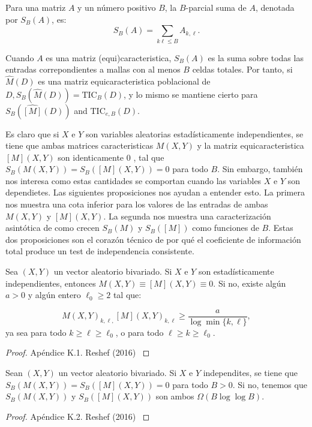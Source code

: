         \begin{defn}
            Para una matriz $A$	y un n\'umero positivo $B$, la $B$-parcial suma de 	$A$, denotada por  $S_B(A)$, es:
            $$
            S_B(A)=\sum_{k \ell \leq B} A_{k, \ell}.
            $$
            
            Cuando $A$ es una matriz (equi)caracteristica, $S_B(A)$ es la suma sobre todas las entradas correpondientes a mallas con al menos $B$ celdas totales. Por tanto, si $\widehat{M}(D)$ es una matriz equicaracteristica poblacional de $D, S_B(\widehat{M}(D))=\mathrm{TIC}_B(D)$, y lo mismo se mantiene cierto para $S_B(\widehat{[M]}(D))$ and $\mathrm{TIC}_{e, B}(D)$.
            
            Es claro que si $X$ e $Y$ son variables aleatorias estad\'isticamente independientes, se tiene que ambas matrices caracteristicas $M(X, Y)$ y la matriz equicaracteristica $[M](X, Y)$ son identicamente 0 , tal que $S_B(M(X, Y))=S_B([M](X, Y))=0$ para todo $B$. Sin embargo, tambi\'en nos interesa como estas cantidades se comportan cuando las variables $X$ e $Y$ son dependietes. Las siguientes proposiciones nos ayudan a entender esto. La primera nos muestra una cota inferior para los valores de las entradas de ambas $M(X, Y)$ y $[M](X, Y)$. La segunda nos muestra una caracterizaci\'on asint\'otica de como crecen $S_B(M)$ y $S_B([M])$ como funciones de $B$. Estas dos proposiciones son el coraz\'on t\'ecnico de por qu\'e el coeficiente de informaci\'on total produce un test de independencia consistente.
            
            \begin{prop}
                Sea $(X, Y)$ un vector aleatorio bivariado. Si $X$ e $Y$ son estad\'isticamente independientes, entonces $M(X, Y) \equiv[M](X, Y) \equiv 0$. Si no, existe alg\'un $a>0$ y alg\'un entero $\ell_0 \geq 2$ tal que:
                
                $$
                M(X, Y)_{k, \ell,}[M](X, Y)_{k, \ell} \geq \frac{a}{\log \min \{k, \ell\}},
                $$
                ya sea para todo $k \geq \ell \geq \ell_0$, o para todo $\ell \geq k \geq \ell_0$.
            \end{prop}
            \begin{proof}
                Ap\'endice K.1. Reshef (2016) \cite{Reshef2016}
            \end{proof}
            \begin{prop}
                Sean $(X, Y)$ un vector aleatorio bivariado. Si $X$ e $Y$ independites, se tiene que  $S_B(M(X, Y))=S_B([M](X, Y))=0$ para todo $B>0$. Si no, tenemos que $S_B(M(X, Y))$ y $S_B([M](X, Y))$ son ambos $\Omega(B \log \log B)$.
            \end{prop}
            \begin{proof}
                Ap\'endice K.2. Reshef (2016) \cite{Reshef2016}
            \end{proof}
    

\end{defn}
